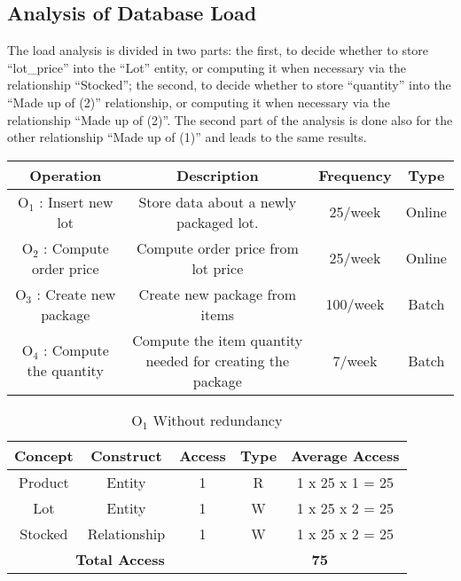 \subsection{Analysis of Database Load}
The load analysis is divided in two parts: the first, to decide whether to store ``lot\_price'' into the ``Lot'' entity, or computing it when necessary via the relationship ``Stocked''; the second, to decide whether to store ``quantity'' into the ``Made up of (2)'' relationship, or computing it when necessary via the relationship ``Made up of (2)''. The second part of the analysis is done also for the other relationship ``Made up of (1)'' and leads to the same results.

\begin{center}
	\begin{tabular}[!h]{ | c | c | c | c | }
		\hline
		\textbf{Operation} & \textbf{Description} & \textbf{Frequency} & \textbf{Type} \\ \hline
		$ \textrm{O}_\textrm{1} $ : Insert new lot & Store data about a newly packaged lot. & 25/week & Online \\ \hline
		$ \textrm{O}_\textrm{2} $ : Compute order price  & Compute order price from lot price & 25/week & Online \\\hline
		$ \textrm{O}_\textrm{3} $ : Create new package & Create new package from items & 100/week & Batch \\\hline
		$ \textrm{O}_\textrm{4} $ : Compute the quantity & Compute the item quantity needed for creating the package & 7/week & Batch \\\hline
	\end{tabular}
\end{center}
\begin{table}[!h]\caption{	$ \textrm{O}_\textrm{1} $ Without redundancy}
	\begin{center}
		\begin{tabular}{| c | c | c | c | c |}
			\hline
			\textbf{Concept} & \textbf{Construct} & \textbf{Access} & \textbf{Type} & \textbf{Average Access} \\ \hline
			Product & Entity & 1 & R & 1 x 25 x 1 = 25 \\ \hline
			Lot & Entity & 1 & W & 1 x 25 x 2 = 25 \\ \hline
			Stocked & Relationship & 1 & W & 1 x 25 x 2 = 25 \\ \hline
			\multicolumn{3}{|c|}{\textbf{Total Access}} & \multicolumn{2}{|c|}{\textbf{75}} \\ \hline
		\end{tabular}
	\end{center}
\end{table}
